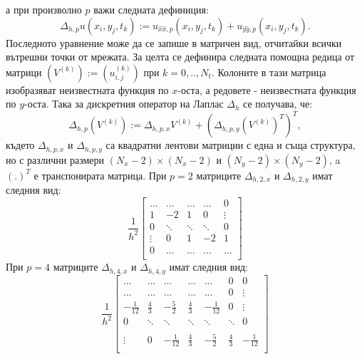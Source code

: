 \documentclass[a4paper]{article}
\newcommand{\be}{\begin{equation}}
\newcommand{\ee}{\end{equation}}
\theoremstyle{remark}
\begin{document}
\begin{large}
а при произволно $p$ важи следната дефиниция:
\be\label{deltaHSingle}
\Delta_{h,p} u(x_i, y_j, t_k) :=  u_{\widehat{xx},p}(x_i, y_j, t_k) + u_{\widehat{yy},p}(x_i, y_j, t_k).
\ee
Последното уравнение може да се запише в матричен вид, отчитайки всички вътрешни точки от мрежата. За целта се дефинира следната помощна редица от матрици $\left(V^{(k)}\right) := (u_{i,j}^{(k)})$ при $k=0,..,N_t$. Колоните в тази матрица изобразяват неизвестната функция по $x$-оста, а редовете - неизвестната функция по $y$-оста. Така за дискретния оператор на Лаплас $\Delta_h$ се получава, че: 
\be\label{DeltaH}
\Delta_{h,p} (V^{(k)})  := \Delta_{h,p,x} V^{(k)} + \left( \Delta_{h,p,y} (V^{(k)})^T \right)^T,
\ee
където $\Delta_{h,p,x}$ и $\Delta_{h,p,y}$ са квадратни лентови матриции с една и съща структура, но с различни размери $(N_x-2) \times (N_x-2)$ и $(N_y-2)\times(N_y-2)$, a $(.)^T$ е транспонирата матрица. При $p=2$ матриците $\Delta_{h,2,x}$ и $\Delta_{h,2,y}$ имат следния вид:
\[
\frac{1}{h^2}
\begin{bmatrix}
    \dots       & \dots        &     \dots   &   \dots        & 0   \\
    1               & -2            &   1           &   0               & \vdots    \\
        0           & \ddots        &    \ddots    &   \ddots       &  0 \\ 
    \vdots       &     0            &  1     	& -2    	   & 1 \\
    0               & \dots          &  \dots         & \dots  	   & \dots \\
\end{bmatrix}
\]
При $p=4$ матриците $\Delta_{h,4,x}$ и $\Delta_{h,4,y}$ имат следния вид:
\[
\frac{1}{h^2}
\begin{bmatrix}
    \dots		& \dots            	& \dots		&   		 \dots  &    \dots      	   &   0           & 0    \\
    \dots    	           &\dots            	& \dots		&   		\dots   &   \dots      	   	   &   0	           & \vdots  \\
    -\frac{1}{12}	& \frac{4}{3}         	& -\frac{5}{2}	&  \frac{4}{3}    	 &   -\frac{1}{12}	  &      0           &\vdots    \\
        0           		& \ddots        	&    \ddots   		 &   \ddots      	 &     \ddots      	  &  \ddots        &    0 \\	
\\
   \vdots      		 & 0           		 &  -\frac{1}{12}	& \frac{4}{3}    	& -\frac{5}{2}	&  \frac{4}{3}  &   -\frac{1}{12} \\

\end{bmatrix}\]
\end{large}
\end{document}
